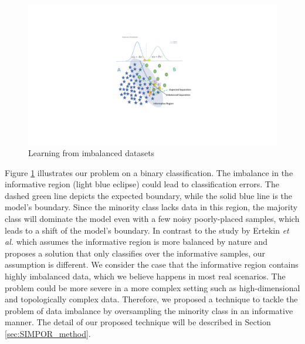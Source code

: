 \documentclass[journal]{IEEEtai}
\begin{document}
\begin{figure}[t!]
	\includegraphics[width=\linewidth, trim=300 150 310 120,clip]{Figures/proplem.pdf}
	\caption{Learning from imbalanced datasets}
	\label{fig:problem}
\end{figure}

Figure \ref{fig:problem} illustrates our problem on a binary classification. The imbalance in the informative region (light blue eclipse) could lead to classification errors. The dashed green line depicts the expected boundary, while the solid blue line is the model's boundary. Since the minority class lacks data in this region, the majority class will dominate the model even with a few noisy poorly-placed samples, which leads to a shift of the model's boundary. In contrast to the study by Ertekin \textit{et al.} \cite{ertekin_learning_2007} which assumes the informative region is more balanced by nature and proposes a solution that only classifies over the informative samples, our assumption is different. We consider the case that the informative region contains highly imbalanced data, which we believe happens in most real scenarios. The problem could be more severe in a more complex setting such as high-dimensional and topologically complex data. Therefore, we proposed a technique to tackle the problem of data imbalance by oversampling the minority class in an informative manner. The detail of our proposed technique will be described in Section \ref{sec:SIMPOR_method}.         









\end{document}
